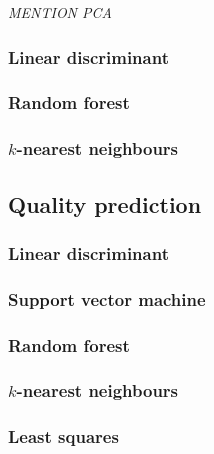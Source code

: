 \documentclass[twoside]{article}
\begin{document}
\begin{multicols}{2}
\emph{MENTION PCA}

\subsubsection{Linear discriminant}

\subsubsection{Random forest}

\subsubsection{$k$-nearest neighbours}

\subsection{Quality prediction}

\subsubsection{Linear discriminant}

\subsubsection{Support vector machine}

\subsubsection{Random forest}

\subsubsection{$k$-nearest neighbours}

\subsubsection{Least squares}



\end{multicols}
\end{document}
